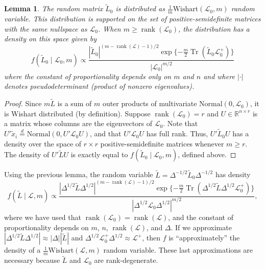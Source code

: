 \documentclass[12pt]{article}
\newcommand{\reals}{\mathbb{R}}
\DeclareMathOperator*{\Tr}{Tr}
\DeclareMathOperator*{\rank}{rank}
\theoremstyle{plain}
\newtheorem{lemma}[theorem]{Lemma}
\begin{document}
\begin{lemma}\label{L:approx-wishart}
  The random matrix $\tilde L_0$ is distributed as $\tfrac{1}{m}
  \mathrm{Wishart }(\mathcal{L}_0, m)$ random variable.
  This distribution is supported on the set of
  positive-semidefinite matrices with the same nullspace as $\mathcal{L}_0$.  When
  $m \geq \rank(\mathcal{L}_0)$, the distribution has a density on this space
  given by
  \begin{equation}\label{E:wishart-density}
   f( \tilde L_0 \mid \mathcal{L}_0, m)
      \propto
      \frac{|\tilde L_0|^{(m - \rank(\mathcal{L}) - 1)/2}
        \exp\{-\tfrac{m}{2} \Tr(\tilde L_0 \mathcal{L}_0^+) \}}
        {|\mathcal{L}_0|^{m/2}}
  \end{equation}
  where the constant of proportionality depends only on $m$ and $n$
  and where $|\cdot|$ denotes pseudodeterminant (product of nonzero
  eigenvalues).
\end{lemma}
\begin{proof}
  Since $m \tilde L$ is a sum of $m$ outer products of multivariate
  $\mathrm{Normal}(0, \mathcal{L}_0)$, it is Wishart distributed
  (by definition).
  Suppose $\rank(\mathcal{L}_0) = r$ and
  $U \in \reals^{n \times r}$ is a matrix whose columns are the
    eigenvectors of $\mathcal{L}_0$.  Note that
    $U' \tilde x_i \overset{d}{=} \mathrm{Normal}(0, U' \mathcal{L}_0 U)$,
    and that $U' \mathcal{L}_0 U$ has full rank.  Thus,
    \(
      U' \tilde L_0 U
    \)
    has a density over the space of $r \times r$ positive-semidefinite
    matrices whenever $m \geq r$.  The density of $U' \tilde L U$ is
    exactly equal to $f(\tilde L_0 \mid \mathcal{L}_0, m)$,
    defined above.
\end{proof}


Using the previous lemma, the random variable $\tilde L = \Delta^{-1/2} \tilde L_0
\Delta^{-1/2}$ has density
\[
  f(\tilde L \mid \mathcal{L}, m)
    \propto
     \frac{|\Delta^{1/2} \tilde L \Delta^{1/2}|^{(m - \rank(\mathcal{L}) - 1)/2}
        \exp\{-\tfrac{m}{2} \Tr(\Delta^{1/2} \tilde L \Delta^{1/2} \mathcal{L}_0^+) \}}
        {|\Delta^{1/2} \mathcal{L}_0 \Delta^{1/2}|^{m/2}},
\]
where we have used that $\rank(\mathcal{L}_0) = \rank(\mathcal{L})$, and
the constant of proportionality depends on $m$, $n$,
$\rank(\mathcal{L})$, and $\Delta$.  If we approximate
$| \Delta^{1/2} \tilde L \Delta^{1/2}| \approx |\Delta| |\tilde L|$
and
$\Delta^{1/2} \mathcal{L}_0^+ \Delta^{1/2} \approx \mathcal{L}^+$,
then $f$ is ``approximately''  the density of a $\tfrac{1}{m}
\mathrm{Wishart }(\mathcal{L}, m)$ random variable.  These last
approximations are necessary because $\tilde L$ and $\mathcal{L}_0$
are rank-degenerate.
\end{document}
